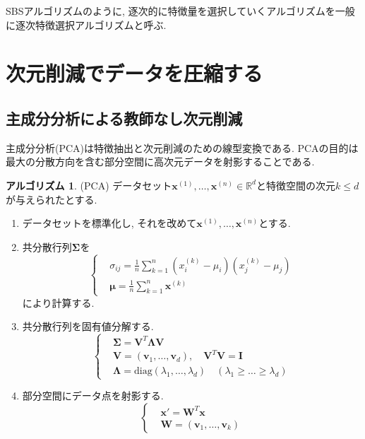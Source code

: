 \documentclass[uplatex]{jsarticle}
\theoremstyle{definition}
\newtheorem{algorithm}[definition]{アルゴリズム}
\numberwithin{equation}{section}
\newcommand{\R}{\mathbb{R}}
\begin{document}
SBSアルゴリズムのように, 逐次的に特徴量を選択していくアルゴリズムを一般に逐次特徴選択アルゴリズムと呼ぶ.


\section{次元削減でデータを圧縮する}
\subsection{主成分分析による教師なし次元削減}
主成分分析(PCA)は特徴抽出と次元削減のための線型変換である.
PCAの目的は最大の分散方向を含む部分空間に高次元データを射影することである.
\begin{algorithm}
    (PCA)
    データセット$\bm{x}^{(1)}, \dots, \bm{x}^{(n)} \in \R^{d}$と特徴空間の次元$k \leq d$が与えられたとする.
    \begin{enumerate}
        \item
        データセットを標準化し, それを改めて$\bm{x}^{(1)}, \dots, \bm{x}^{(n)}$とする.

        \item
        共分散行列$\bm{\Sigma}$を
        \begin{equation}
            \left\{
            \begin{aligned}
                &\sigma_{ij} = \frac{1}{n}\sum_{k = 1}^{n} (x^{(k)}_{i} - \mu_{i})(x^{(k)}_{j} - \mu_{j}) \\
                &\bm{\mu} = \frac{1}{n}\sum_{k = 1}^{n} \bm{x}^{(k)}
            \end{aligned}
            \right.
        \end{equation}
        により計算する.

        \item
        共分散行列を固有値分解する.
        \begin{equation}
            \left\{
            \begin{aligned}
                &\bm{\Sigma} = \bm{V}^{T}\bm{\Lambda}\bm{V} \\
                &\bm{V} = (\bm{v}_{1}, \dots, \bm{v}_{d}), \quad \bm{V}^{T}\bm{V} = \bm{I} \\
                &\bm{\Lambda} = \mathrm{diag}(\lambda_{1}, \dots, \lambda_{d}) \quad (\lambda_{1} \geq \dots \geq \lambda_{d})
            \end{aligned}
            \right.
        \end{equation}

        \item
        部分空間にデータ点を射影する.
        \begin{equation}
            \left\{
            \begin{aligned}
                &\bm{x}' = \bm{W}^{T}\bm{x} \\
                &\bm{W} = (\bm{v}_{1}, \dots, \bm{v}_{k})
            \end{aligned}
            \right.
        \end{equation}
    \end{enumerate}
\end{algorithm}
\end{document}
